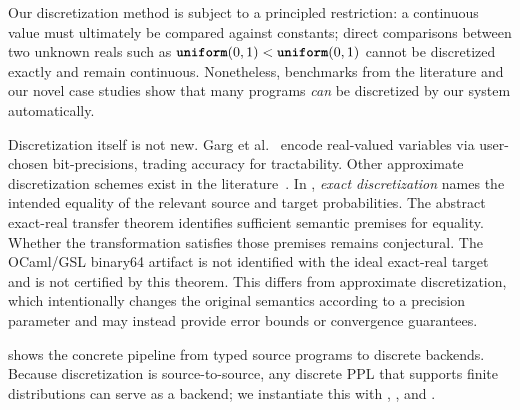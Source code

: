 Our discretization method is subject to a principled restriction: a continuous value must ultimately be compared against constants; direct comparisons between two unknown reals such as $\textnormal{\ttfamily\bfseries uniform}(0,1)<\textnormal{\ttfamily\bfseries uniform}(0,1)$ cannot be discretized exactly and remain continuous. Nonetheless, benchmarks from the literature and our novel case studies show that many programs \emph{can} be discretized by our system automatically.

Discretization itself is not new. Garg et al.~\cite{Garg2024BitBlast} encode real-valued variables via user-chosen bit-precisions, trading accuracy for tractability. Other approximate discretization schemes exist in the literature~\cite{Huang2021AQUA,Beutner2022GuaranteedBounds,Claret2013BayesianDataFlow}. In \Slice{}, \emph{exact discretization} names the intended equality of the relevant source and target probabilities. The abstract exact-real transfer theorem identifies sufficient semantic premises for equality. Whether the \Slice{} transformation satisfies those premises remains conjectural. The OCaml/GSL binary64 artifact is not identified with the ideal exact-real target and is not certified by this theorem. This differs from approximate discretization, which intentionally changes the original semantics according to a precision parameter and may instead provide error bounds or convergence guarantees.

 shows the concrete pipeline from typed source programs to discrete backends. Because discretization is source-to-source, any discrete PPL that supports finite distributions can serve as a  backend; we instantiate this with \Dice{} \cite{Holtzen2020Dice}, \Roulette{} \cite{Moy2025Roulette}, and \Storm{} \cite{storm}.


